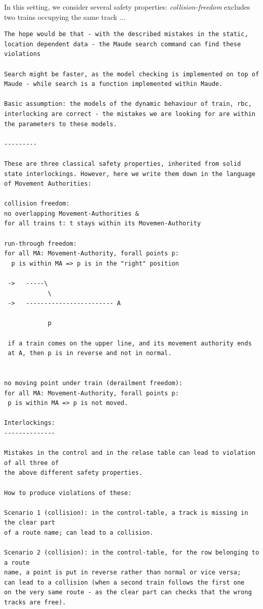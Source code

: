 In this setting, we consider several safety properties:
\emph{collision-freedom} excludes two trains occupying the same track ... 


\begin{verbatim}
The hope would be that - with the described mistakes in the static, location dependent data - the Maude search command can find these violations

Search might be faster, as the model checking is implemented on top of Maude - while search is a function implemented within Maude.

Basic assumption: the models of the dynamic behaviour of train, rbc, interlocking are correct - the mistakes we are looking for are within the parameters to these models.

---------

These are three classical safety properties, inherited from solid
state interlockings. However, here we write them down in the language
of Movement Authorities:

collision freedom:
no overlapping Movement-Authorities &
for all trains t: t stays within its Movemen-Authority

run-through freedom:
for all MA: Movement-Authority, forall points p:
  p is within MA => p is in the "right" position

 ->   -----\
            \
 ->   ------------------------ A

            p

 if a train comes on the upper line, and its movement authority ends
 at A, then p is in reverse and not in normal.


no moving point under train (derailment freedom):
for all MA: Movement-Authority, forall points p:
 p is within MA => p is not moved.

Interlockings:
--------------

Mistakes in the control and in the relase table can lead to violation of all three of
the above different safety properties.

How to produce violations of these:

Scenario 1 (collision): in the control-table, a track is missing in the clear part
of a route name; can lead to a collision.

Scenario 2 (collision): in the control-table, for the row belonging to a route
name, a point is put in reverse rather than normal or vice versa;
can lead to a collision (when a second train follows the first one
on the very same route - as the clear part can checks that the wrong
tracks are free).


\end{verbatim}
